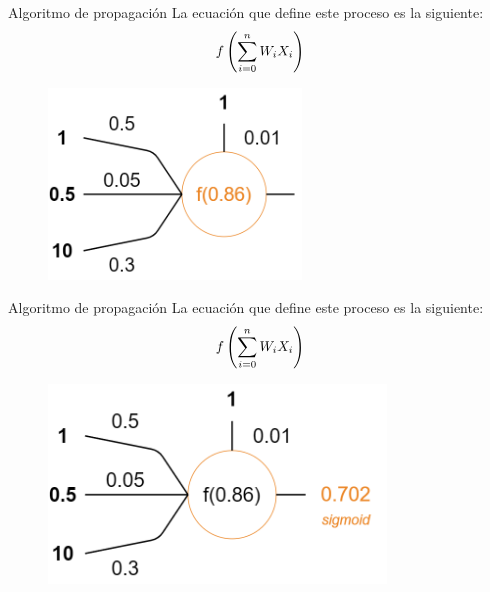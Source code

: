 \begin{frame}{Algoritmo de propagación}
La ecuación que define este \alert{proceso} es la siguiente:
\setcounter{equation}{0}
\begin{equation}
    \Large f\left(\sum_{i=0}^{n} W_{i} X_{i}\right)
\end{equation}

\begin{figure}
\centering
    \includegraphics[width=0.6\textwidth]{figures/Tema 3/PropagationExample_4.png}
\end{figure}
\end{frame}

\begin{frame}{Algoritmo de propagación}
La ecuación que define este \alert{proceso} es la siguiente:
\setcounter{equation}{0}
\begin{equation}
    \Large f\left(\sum_{i=0}^{n} W_{i} X_{i}\right)
\end{equation}

\begin{figure}
\centering
    \includegraphics[width=0.8\textwidth]{figures/Tema 3/PropagationExample_5.png}
\end{figure}
\end{frame}

